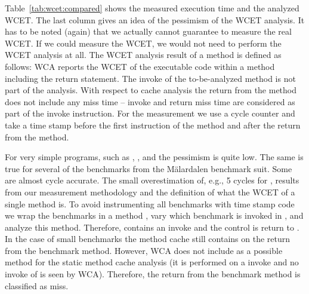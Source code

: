 
%

Table~\ref{tab:wcet:compared} shows the measured execution time and
the analyzed WCET. The last column gives an idea of the pessimism of
the WCET analysis. It has to be noted (again) that we actually cannot
guarantee to measure the real WCET. If we could measure the WCET, we
would not need to perform the WCET analysis at all. The WCET analysis
result of a method is defined as follows: WCA reports the WCET of the
executable code within a method including the return statement. The
invoke of the to-be-analyzed method is not part of the analysis. With
respect to cache analysis the return from the method does not include
any miss time -- invoke and return miss time are considered as part
of the invoke instruction. For the measurement we use a cycle counter
and take a time stamp before the first instruction of the method and
after the return from the method.

For very simple programs, such as , , and
 the pessimism is quite low. The same is true for several
of the benchmarks from the M\"alardalen benchmark suit. Some are
almost cycle accurate. The small overestimation of, e.g., 5 cycles
for , results from our measurement methodology and
the definition of what the WCET of a single method is. To avoid
instrumenting all benchmarks with time stamp code we wrap the
benchmarks in a method , vary which benchmark is
invoked in , and analyze this method. Therefore,
 contains an invoke and the control is return to
. In the case of small benchmarks the method cache
still contains  on the return from the benchmark
method. However, WCA does not include  as a possible
method for the static method cache analysis (it is performed on a
invoke and no invoke of  is seen by WCA). Therefore,
the return from the benchmark method is classified as miss.

